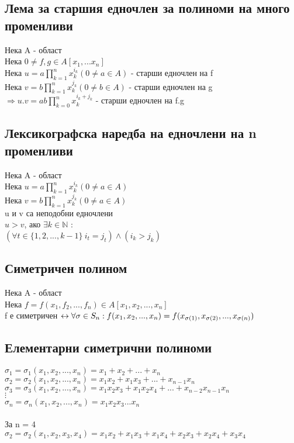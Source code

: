 \documentclass[12pt]{article}
\begin{document}
\subsection{Лема за старшия едночлен за полиноми на много променливи}
Нека A - област \\
Нека $0 \neq f,g \in A[x_1,...x_n]$ \\
Нека $u = a\prod\limits_{k=1}^{n}x_k^{i_k} (0 \neq a \in A)$ - старши едночлен на f\\
Нека $v = b\prod\limits_{k=1}^{n}x_k^{j_k} (0 \neq b \in A)$ - старши едночлен на g\\
$\Rightarrow u.v = ab\prod\limits_{k=0}^{n}x_k^{i_k+j_k}$ - старши едночлен на f.g

\subsection{Лексикографска наредба на едночлени на n променливи}
Нека A - област \\
Нека $u = a\prod\limits_{k=1}^{n}x_k^{i_k}(0 \neq a \in A)$\\
Нека $v = b\prod\limits_{k=1}^{n}x_k^{j_k}(0 \neq a \in A)$\\
u и v са неподобни едночлени \\
$u > v$, ако $\exists k \in \mathbb{N}$ : \\
$(\forall t\in\{1,2,...,k-1\} \ i_t = j_t) \land (i_k > j_k)$

\subsection{Симетричен полином}
Нека A - област\\
Нека $f = f(x_1, f_2, ..., f_n) \in A[x_1,x_2, ..., x_n]$ \\
f е симетричен $\leftrightarrow \forall \sigma \in S_n : \\
f(x_1, x_2, ..., x_n) = f(x_{\sigma(1)}, x_{\sigma(2)}, ..., x_{\sigma(n)})$

\clearpage
\subsection{Елементарни симетрични полиноми}
$\sigma_1=\sigma_1(x_1,x_2,...,x_n)=x_1+x_2+...+x_n$\\
$\sigma_2=\sigma_2(x_1,x_2,...,x_n)=x_1x_2+x_1x_3+...+x_{n-1}x_n$\\
$\sigma_3=\sigma_3(x_1,x_2,...,x_n)=x_1x_2x_3+x_1x_2x_4+...+x_{n-2}x_{n-1}x_n$\\
$\vdots$\\
$\sigma_n=\sigma_n(x_1,x_2,...,x_n)=x_1x_2x_3...x_n$\\\\
За n = 4 \\
$\sigma_2=\sigma_2(x_1,x_2,x_3,x_4)=x_1x_2+x_1x_3+x_1x_4+x_2x_3+x_2x_4+x_3x_4$\\
\end{document}
